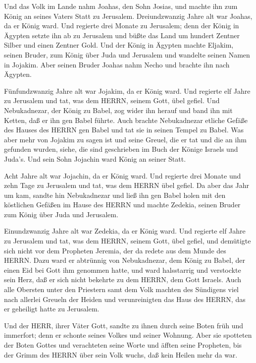  Und das Volk im Lande nahm Joahas, den Sohn Josias, und
machte ihn zum König an seines Vaters Statt zu Jerusalem. 
Dreiundzwanzig Jahre alt war Joahas, da er König ward. Und regierte drei
Monate zu Jerusalem;  denn der König in Ägypten setzte ihn
ab zu Jerusalem und büßte das Land um hundert Zentner Silber und einen
Zentner Gold.  Und der König in Ägypten machte Eljakim,
seinen Bruder, zum König über Juda und Jerusalem und wandelte seinen
Namen in Jojakim. Aber seinen Bruder Joahas nahm Necho und brachte ihn
nach Ägypten.

 Fünfundzwanzig Jahre alt war Jojakim, da er König ward. Und
regierte elf Jahre zu Jerusalem und tat, was dem HERRN, seinem Gott,
übel gefiel.  Und Nebukadnezar, der König zu Babel, zog
wider ihn herauf und band ihn mit Ketten, daß er ihn gen Babel führte.
 Auch brachte Nebukadnezar etliche Gefäße des Hauses des
HERRN gen Babel und tat sie in seinen Tempel zu Babel.  Was
aber mehr von Jojakim zu sagen ist und seine Greuel, die er tat und die
an ihm gefunden wurden, siehe, die sind geschrieben im Buch der Könige
Israels und Juda's. Und sein Sohn Jojachin ward König an seiner Statt.

 Acht Jahre alt war Jojachin, da er König ward. Und regierte
drei Monate und zehn Tage zu Jerusalem und tat, was dem HERRN übel
gefiel.  Da aber das Jahr um kam, sandte hin Nebukadnezar
und ließ ihn gen Babel holen mit den köstlichen Gefäßen im Hause des
HERRN und machte Zedekia, seinen Bruder zum König über Juda und
Jerusalem.

 Einundzwanzig Jahre alt war Zedekia, da er König ward. Und
regierte elf Jahre zu Jerusalem  und tat, was dem HERRN,
seinem Gott, übel gefiel, und demütigte sich nicht vor dem Propheten
Jeremia, der da redete aus dem Munde des HERRN.  Dazu ward
er abtrünnig von Nebukadnezar, dem König zu Babel, der einen Eid bei
Gott ihm genommen hatte, und ward halsstarrig und verstockte sein Herz,
daß er sich nicht bekehrte zu dem HERRN, dem Gott Israels. 
Auch alle Obersten unter den Priestern samt dem Volk machten des
Sündigens viel nach allerlei Greueln der Heiden und verunreinigten das
Haus des HERRN, das er geheiligt hatte zu Jerusalem.

 Und der HERR, ihrer Väter Gott, sandte zu ihnen durch
seine Boten früh und immerfort; denn er schonte seines Volkes und seiner
Wohnung.  Aber sie spotteten der Boten Gottes und
verachteten seine Worte und äfften seine Propheten, bis der Grimm des
HERRN über sein Volk wuchs, daß kein Heilen mehr da war.

